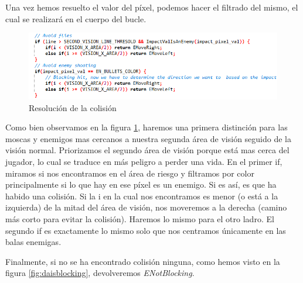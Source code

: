Una vez hemos resuelto el valor del píxel, podemos hacer el filtrado del mismo, el cual se realizará en el cuerpo del bucle.

\begin{figure}[h]
	\centering
	\includegraphics[width=1\textwidth]{Figures/cuerpobucleisblockingda}
	\caption{Resolución de la colisión}
	\label{fig:cuerpobucleisblockingda}
\end{figure}

Como bien observamos en la figura 	\ref{fig:cuerpobucleisblockingda}, haremos una primera distinción para las moscas y enemigos mas cercanos a nuestra segunda área de visión seguido de la visión normal. Priorizamos el segundo área de visión porque está mas cerca del jugador, lo cual se traduce en más peligro a perder una vida. En el primer if, miramos si nos encontramos en el área de riesgo y filtramos por color principalmente si lo que hay en ese píxel es un enemigo. Si es así, es que ha habido una colisión. Si la i en la cual nos encontramos es menor (o está a la izquierda) de la mitad del área de visión, nos moveremos a la derecha (camino más corto para evitar la colisión). Haremos lo mismo para el otro ladro. El segundo if es exactamente lo mismo solo que nos centramos únicamente en las balas enemigas.

Finalmente, si no se ha encontrado colisión ninguna, como hemos visto en la figura \ref{fig:daisblocking}, devolveremos \textit{ENotBlocking}.

